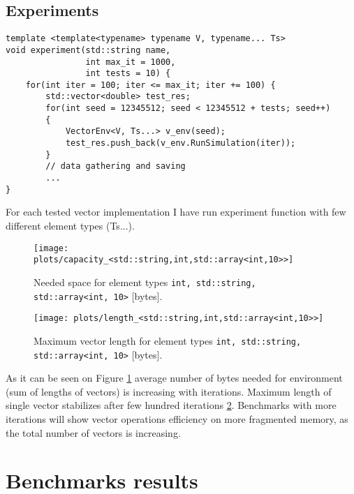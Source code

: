 \documentclass[inz, english, shortabstract]{iithesis}
\begin{document}
\section {Experiments}
\begin{lstlisting}[caption=experiment function]
template <template<typename> typename V, typename... Ts>
void experiment(std::string name, 
				int max_it = 1000, 
				int tests = 10) {
	for(int iter = 100; iter <= max_it; iter += 100) {
		std::vector<double> test_res;
		for(int seed = 12345512; seed < 12345512 + tests; seed++) 
		{
			VectorEnv<V, Ts...> v_env(seed);
			test_res.push_back(v_env.RunSimulation(iter));
		}
		// data gathering and saving
		...
}
\end{lstlisting}
For each tested vector implementation I have run experiment function with few different element types (Ts...). 

\begin{figure}[h!]
\label{space_consumption}
\texttt{[image: plots/capacity\_<std::string,int,std::array<int,10>>]}
\caption{Needed space for element types \lstinline{int, std::string, std::array<int, 10>} [bytes].}
\end{figure}

\begin{figure}[h!]
\label{vector_length}
\texttt{[image: plots/length\_<std::string,int,std::array<int,10>>]}
\caption{Maximum vector length for element types \lstinline{int, std::string, std::array<int, 10>} [bytes].}
\end{figure}


As it can be seen on Figure \ref{space_consumption} average number of bytes needed for environment (sum of lengths of vectors) is increasing with iterations. Maximum length of single vector stabilizes after few hundred iterations \ref{vector_length}. Benchmarks with more iterations will show vector operations efficiency on more fragmented memory, as the total number of vectors is increasing.

\chapter{Benchmarks results}
\end{document}
